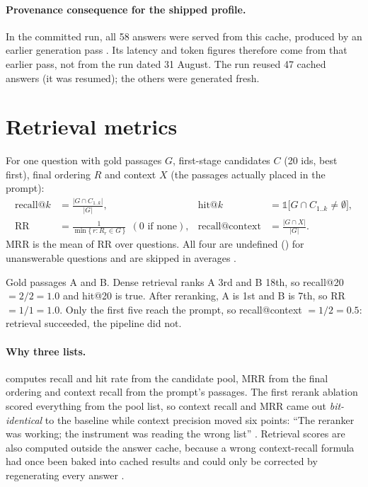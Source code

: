 \paragraph{Provenance consequence for the shipped profile.} In the committed  run, all 58 answers were served from this cache, produced by an earlier  generation pass \tagM. Its latency and token figures therefore come from that earlier pass, not from the run dated 31 August. The  run reused 47 cached answers (it was resumed); the others were generated fresh.

\section{Retrieval metrics}
\label{sec:retrieval-metrics}

For one question with gold passages $G$, first-stage candidates $C$ (20 ids, best first), final ordering $R$ and context $X$ (the passages actually placed in the prompt):
\begin{align}
\text{recall@}k &= \frac{|G \cap C_{1..k}|}{|G|}, &
\text{hit@}k &= \mathbb{1}\bigl[G \cap C_{1..k} \neq \emptyset\bigr],\\
\text{RR} &= \frac{1}{\min\{\,r : R_r \in G\,\}}\ \ (0 \text{ if none}), &
\text{recall@context} &= \frac{|G \cap X|}{|G|}.
\end{align}
MRR is the mean of RR over questions. All four are undefined () for unanswerable questions and are skipped in averages .

\begin{example}
Gold passages A and B. Dense retrieval ranks A 3rd and B 18th, so recall@20 $= 2/2 = 1.0$ and hit@20 is true. After reranking, A is 1st and B is 7th, so RR $= 1/1 = 1.0$. Only the first five reach the prompt, so recall@context $= 1/2 = 0.5$: retrieval succeeded, the pipeline did not.
\end{example}

\paragraph{Why three lists.}  computes recall and hit rate from the candidate pool, MRR from the final ordering and context recall from the prompt's passages. The first rerank ablation scored everything from the pool list, so context recall and MRR came out \emph{bit-identical} to the baseline while context precision moved six points: \enquote{The reranker was working; the instrument was reading the wrong list} . Retrieval scores are also computed outside the answer cache, because a wrong context-recall formula had once been baked into cached results and could only be corrected by regenerating every answer .

